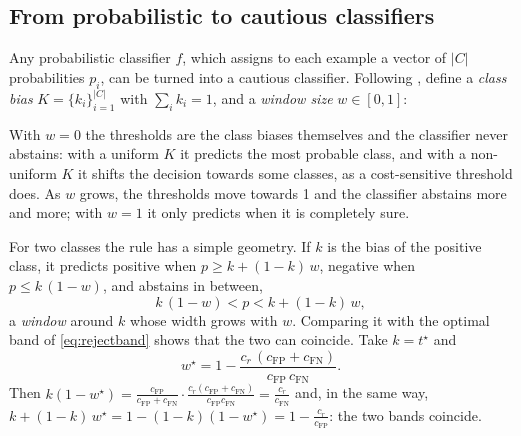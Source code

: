 \subsection{From probabilistic to cautious classifiers}

Any probabilistic classifier $f$, which assigns to each example a vector of $|C|$ probabilities
$p_i$, can be turned into a cautious classifier. Following \citet{ferri2004cautious}, define a
\emph{class bias} $K=\{k_i\}_{i=1}^{|C|}$ with $\sum_ik_i=1$, and a \emph{window size}
$w\in[0,1]$:
\begin{center}
\end{center}
With $w=0$ the thresholds are the class biases themselves and the classifier never abstains: with
a uniform $K$ it predicts the most probable class, and with a non-uniform $K$ it shifts the
decision towards some classes, as a cost-sensitive threshold does. As $w$ grows, the thresholds
move towards 1 and the classifier abstains more and more; with $w=1$ it only predicts when it is
completely sure.

For two classes the rule has a simple geometry. If $k$ is the bias of the positive class, it
predicts positive when $p\geq k+(1-k)\,w$, negative when $p\leq k\,(1-w)$, and abstains in
between,
\begin{equation}\label{eq:windowband}
  k\,(1-w)<p<k+(1-k)\,w,
\end{equation}
a \emph{window} around $k$ whose width grows with $w$. Comparing it with the optimal band of
\cref{eq:rejectband} shows that the two can coincide. Take $k=t^\star$ and
\begin{equation}\label{eq:wstar}
  w^\star=1-\frac{c_r\,(c_{\mathrm{FP}}+c_{\mathrm{FN}})}{c_{\mathrm{FP}}\,c_{\mathrm{FN}}}.
\end{equation}
Then $k(1-w^\star)=\frac{c_{\mathrm{FP}}}{c_{\mathrm{FP}}+c_{\mathrm{FN}}}\cdot
\frac{c_r(c_{\mathrm{FP}}+c_{\mathrm{FN}})}{c_{\mathrm{FP}}c_{\mathrm{FN}}}=\frac{c_r}{c_{\mathrm{FN}}}$
and, in the same way, $k+(1-k)\,w^\star=1-(1-k)(1-w^\star)=1-\frac{c_r}{c_{\mathrm{FP}}}$: the two
bands coincide.

